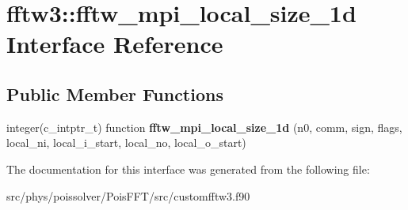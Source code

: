 \hypertarget{interfacefftw3_1_1fftw__mpi__local__size__1d}{}\section{fftw3\+:\+:fftw\+\_\+mpi\+\_\+local\+\_\+size\+\_\+1d Interface Reference}
\label{interfacefftw3_1_1fftw__mpi__local__size__1d}
\subsection*{Public Member Functions}
\begin{DoxyCompactItemize}
\item 
integer(c\+\_\+intptr\+\_\+t) function {\bfseries fftw\+\_\+mpi\+\_\+local\+\_\+size\+\_\+1d} (n0, comm, sign, flags, local\+\_\+ni, local\+\_\+i\+\_\+start, local\+\_\+no, local\+\_\+o\+\_\+start)\hypertarget{interfacefftw3_1_1fftw__mpi__local__size__1d_a24311417b40e9ab6b87f40e3a689e542}{}\label{interfacefftw3_1_1fftw__mpi__local__size__1d_a24311417b40e9ab6b87f40e3a689e542}

\end{DoxyCompactItemize}


The documentation for this interface was generated from the following file\+:\begin{DoxyCompactItemize}
\item 
src/phys/poissolver/\+Pois\+F\+F\+T/src/customfftw3.\+f90\end{DoxyCompactItemize}
